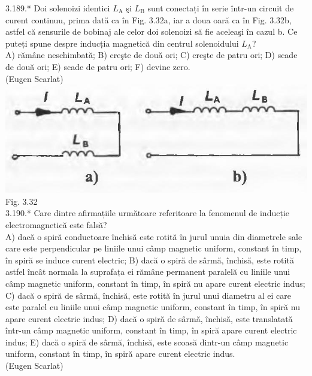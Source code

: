 \documentclass[10pt]{article}
\begin{document}
3.189.* Doi solenoizi identici $L_{\mathrm{A}}$ şi $L_{\mathrm{B}}$ sunt conectați în serie într-un circuit de curent continuu, prima dată ca în Fig. 3.32a, iar a doua oară ca în Fig. 3.32b, astfel că sensurile de bobinaj ale celor doi solenoizi să fie aceleaşi în cazul b. Ce puteți spune despre inducția magnetică din centrul solenoidului $L_{\mathrm{A}}$?\\ A) rămâne neschimbată; B) creşte de două ori; C) creşte de patru ori; D) scade de două ori; E) scade de patru ori; F) devine zero.\\  (Eugen Scarlat)\\ \includegraphics[max width=\textwidth, center]{2025_07_01_5b3ff9fa0d508c8e9f17g-187(1)} Fig. 3.32\\

3.190.* Care dintre afirmațiile următoare referitoare la fenomenul de inducție electromagnetică este falsă?\\ A) dacă o spiră conductoare închisă este rotită în jurul unuia din diametrele sale care este perpendicular pe liniile unui câmp magnetic uniform, constant în timp, în spiră se induce curent electric; B) dacă o spiră de sârmă, închisă, este rotită astfel încât normala la suprafața ei rămâne permanent paralelă cu liniile unui câmp magnetic uniform, constant în timp, în spiră nu apare curent electric indus; C) dacă o spiră de sârmă, închisă, este rotită în jurul unui diametru al ei care este paralel cu liniile unui câmp magnetic uniform, constant în timp, în spiră nu apare curent electric indus; D) dacă o spiră de sârmă, închisă, este translatată într-un câmp magnetic uniform, constant în timp, în spiră apare curent electric indus; E) dacă o spiră de sârmă, închisă, este scoasă dintr-un câmp magnetic uniform, constant în timp, în spiră apare curent electric indus.\\ (Eugen Scarlat)\\
\end{document}
